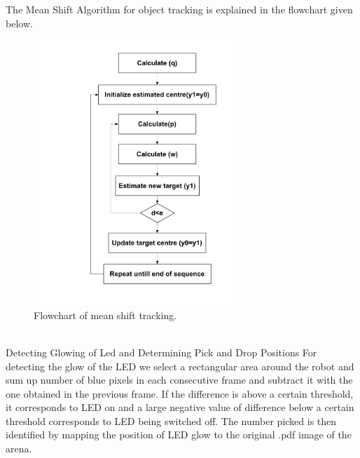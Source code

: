 \documentclass[a4paper,12pt,oneside]{book}
\begin{document}
    The Mean Shift Algorithm for object tracking is explained in the flowchart given below.\\
    \begin{figure}[h!]
		\includegraphics[width=1.2\linewidth, height=10cm]{poc-1.jpg}
		\centering
		\caption{Flowchart of mean shift tracking.}
	\end{figure}\\

Detecting Glowing of Led and Determining Pick and Drop Positions
For detecting the glow of the LED we select a rectangular area around the robot and sum up number of blue pixels in each consecutive frame and subtract it with the one obtained in the previous frame. If the difference is above a certain threshold, it corresponds to LED on and a large negative value of difference below a certain threshold corresponds to LED being switched off. The number picked is then identified by mapping the position of LED glow to the original .pdf image of the arena.  
\end{document}

